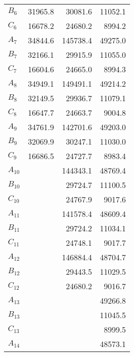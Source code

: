 \begin{table}
\begin{tabular}{lrrr}
$B_{6    }$ &         31965.8 &         30081.6 &         11052.1 \\
$C_{6    }$ &         16678.2 &         24680.2 &          8994.2 \\
$A_{7    }$ &         34844.6 &        145738.4 &         49275.0 \\
$B_{7    }$ &         32166.1 &         29915.9 &         11055.0 \\
$C_{7    }$ &         16604.6 &         24665.0 &          8994.3 \\
$A_{8    }$ &         34949.1 &        149491.1 &         49214.2 \\
$B_{8    }$ &         32149.5 &         29936.7 &         11079.1 \\
$C_{8    }$ &         16647.7 &         24663.7 &          9004.8 \\
$A_{9    }$ &         34761.9 &        142701.6 &         49203.0 \\
$B_{9    }$ &         32069.9 &         30247.1 &         11030.0 \\
$C_{9    }$ &         16686.5 &         24727.7 &          8983.4 \\
$A_{10   }$ &                 &        144343.1 &         48769.4 \\
$B_{10   }$ &                 &         29724.7 &         11100.5 \\
$C_{10   }$ &                 &         24767.9 &          9017.6 \\
$A_{11   }$ &                 &        141578.4 &         48609.4 \\
$B_{11   }$ &                 &         29724.2 &         11034.1 \\
$C_{11   }$ &                 &         24748.1 &          9017.7 \\
$A_{12   }$ &                 &        146884.4 &         48704.7 \\
$B_{12   }$ &                 &         29443.5 &         11029.5 \\
$C_{12   }$ &                 &         24680.2 &          9016.7 \\
$A_{13   }$ &                 &                 &         49266.8 \\
$B_{13   }$ &                 &                 &         11045.5 \\
$C_{13   }$ &                 &                 &          8999.5 \\
$A_{14   }$ &                 &                 &         48573.1 \\

\end{tabular}
\end{table}
